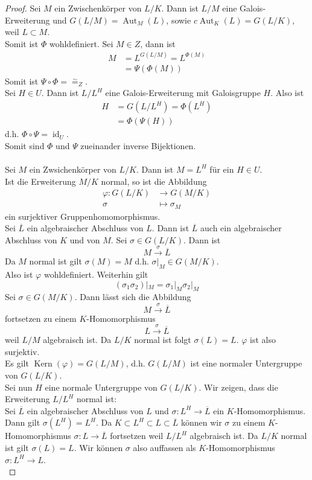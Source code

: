 \documentclass[10pt,a4paper]{article}
\newcommand{\ol}[1]{\overline{#1}}
\newcommand{\id}{\operatorname{id}}
\newcommand{\isom}{\overset{\sim}{=}}
\newcommand{\Kern}{\operatorname{Kern}}
\newcommand{\Aut}{\operatorname{Aut}}
\theoremstyle{plain}
\theoremstyle{definition}
\theoremstyle{remark}
\begin{document}
	\begin{proof}
		Sei $M$ ein Zwischenkörper von $L/K$. Dann ist $L/M$ eine Galois-Erweiterung und $G(L/M)=\Aut_M(L)$, sowie $c\Aut_K(L)=G(L/K)$, weil $L\subset M$.\\
		Somit ist $\Phi$ wohldefiniert. Sei $M\in Z$, dann ist
		\begin{align*}
		M&=L^{G(L/M)}=L^{\Phi(M)}\\
		&=\Psi(\Phi(M))
		\end{align*}
		Somit ist $\Psi\circ\Phi=\isom_Z$.\\
		Sei $H\in U$. Dann ist $L/L^H$ eine Galois-Erweiterung mit Galoisgruppe $H$. Also ist
		\begin{align*}
		H&=G(L/L^H)=\Phi(L^H)\\
		&=\Phi(\Psi(H))
		\end{align*}
		d.h. $\Phi\circ\Psi=\id_U$.\\
		Somit sind $\Phi$ und $\Psi$ zueinander inverse Bijektionen.\\
		\\
		Sei $M$ ein Zwsichenkörper von $L/K$. Dann ist $M=L^H$ für ein $H\in U$.\\
		Ist die Erweiterung $M/K$ normal, so ist die Abbildung
		\begin{align*}
		\varphi:G(L/K)&\to G(M/K)\\
		\sigma&\mapsto \sigma_M
		\end{align*}
		ein surjektiver Gruppenhomomorphismus.\\
		Sei $\ol L$ ein algebraischer Abschluss von $L$. Dann ist $\ol L$ auch ein algebraischer Abschluss von $K$ und von $M$. Sei $\sigma\in G(L/K)$. Dann ist
		\[M\xrightarrow{\sigma}\ol L\]
		Da $M$ normal ist gilt $\sigma(M)=M$ d.h. $\sigma|_M\in G(M/K)$.\\
		Also ist $\varphi$ wohldefiniert. Weiterhin gilt
		\[(\sigma_1\sigma_2)|_M=\sigma_1|_M\sigma_2|_M\]
		Sei $\sigma\in G(M/K)$. Dann lässt sich die Abbildung
		\[M\xrightarrow{\sigma}\ol L\]
		fortsetzen zu einem $K$-Homomorphismus
		\[L\xrightarrow{\sigma}\ol L\]
		weil $L/M$ algebraisch ist. Da $L/K$ normal ist folgt $\sigma(L)=L$. $\varphi$ ist also surjektiv.\\
		Es gilt $\Kern(\varphi)=G(L/M)$, d.h. $G(L/M)$ ist eine normaler Untergruppe von $G(L/K)$.\\
		Sei nun $H$ eine normale Untergruppe von $G(L/K)$. Wir zeigen, dass die Erweiterung $L/L^H$ normal ist:\\
		Sei $\ol L$ ein algebraischer Abschluss von $L$ und $\sigma:L^H\to\ol L$ ein $K$-Homomorphismus. Dann gilt $\sigma(L^H)=L^H$. Da $K\subset L^H\subset L\subset\ol L$ können wir $\sigma$ zu einem $K$-Homomorphismus $\sigma:L\to\ol L$ fortsetzen weil $L/L^H$ algebraisch ist. Da $L/K$ normal ist gilt $\sigma(L)=L$. Wir können $\sigma$ also auffassen als $K$-Homomorphismus $\sigma:L^H\to L$.\\

\end{proof}
\end{document}
